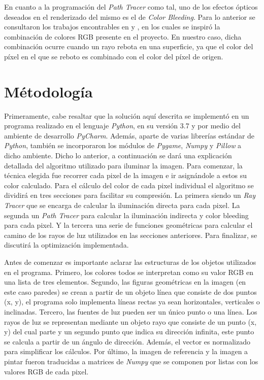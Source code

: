 \documentclass[conference]{IEEEtran}
\begin{document}
En cuanto a la programación del \textit{Path Tracer} como tal, uno de los efectos ópticos deseados en el renderizado del mismo es el de \textit{Color Bleeding}. Para lo anterior se consultaron los trabajos encontrables en \cite{b3} y \cite{b4}, en los cuales se inspiró la combinación de colores RGB presente en el proyecto. En nuestro caso, dicha combinación ocurre cuando un rayo rebota en una superficie, ya que el color del píxel en el que se reboto es combinado con el color del píxel de origen.

\section{Métodología}
Primeramente, cabe resaltar que la solución aquí descrita se implementó en un programa realizado en el lenguaje \textit{Python}, en su versión 3.7 y por medio del ambiente de desarrollo \textit{PyCharm}. Además, aparte de varias librerías estándar de \textit{Python}, también se incorporaron los módulos de \textit{Pygame}, \textit{Numpy} y \textit{Pillow} a dicho ambiente. Dicho lo anterior, a continuación se dará una explicación detallada del algoritmo utilizado para iluminar la imagen. Para comenzar, la técnica elegida fue recorrer cada pixel de la imagen e ir asignándole a estos su color calculado. Para el cálculo del color de cada pixel individual el algoritmo se dividirá en tres secciones para facilitar su compresión. La primera siendo un \textit{Ray Tracer} que se encarga de calcular la iluminación directa para cada pixel. La segunda un \textit{Path Tracer} para calcular la iluminación indirecta y color bleeding para cada pixel. Y la tercera una serie de funciones geométricas para calcular el camino de los rayos de luz utilizados en las secciones anteriores. Para finalizar, se discutirá la optimización implementada. 

Antes de comenzar es importante aclarar las estructuras de los objetos utilizados en el programa. Primero, los colores todos se interpretan como su valor RGB en una lista de tres elementos. Segundo, las figuras geométricas en la imagen (en este caso paredes) se crean a partir de un objeto línea que consiste de dos puntos (x, y), el programa solo implementa líneas rectas ya sean horizontales, verticales o inclinadas. Tercero, las fuentes de luz pueden ser un único punto o una línea. Los rayos de luz se representan mediante un objeto rayo que consiste de un punto (x, y) del cual parte y un segundo punto que indica su dirección infinita, este punto se calcula a partir de un ángulo de dirección. Además, el vector es normalizado para simplificar los cálculos. Por último, la imagen de referencia y la imagen a pintar fueron traducidas a matrices de \textit{Numpy} que se componen por listas con los valores RGB de cada pixel. 
\end{document}
